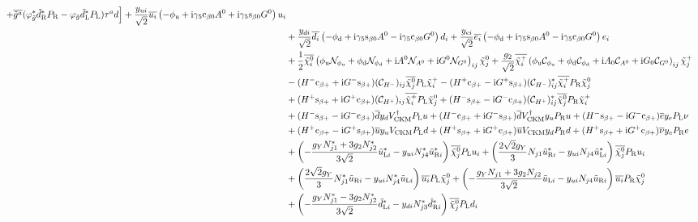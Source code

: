 \documentclass[CheatSheet]{subfiles}
\begin{document}
\begin{equation}
\begin{split}
 + \overline{\tig^a}(\varphi^*_{\tilde g} \tdR^{*}\PR -\varphi_{\tilde g}\tdL^{*}\PL) \tau^{a}d
\Bigr]
+\frac{\yu[i]}{\sqrt2}\overline{u_i}\left(- {\phi\w u}+\ii\gamma_5\co{\beta0}A^0 + \ii\gamma_5\si{\beta0}G^0\right) u_i
\\&
+\frac{\yd[i]}{\sqrt2}\overline{d_i}\left(- {\phi\w d}+\ii\gamma_5\si{\beta0}A^0 - \ii\gamma_5\co{\beta0}G^0\right) d_i
+\frac{\ye[i]}{\sqrt2}\overline{e_i}\left(- {\phi\w d}+\ii\gamma_5\si{\beta0}A^0 - \ii\gamma_5\co{\beta0}G^0\right) e_i
\\&
+ \frac12\overline{\neut[i]}\left(
    \phi\w u \mathcal N_{\phi\w u}  + \phi\w d \mathcal N_{\phi\w d}  + \ii A^0 \mathcal N_{A^0}  + \ii G^0\mathcal N_{G^0}
  \right)_{ij}\neut[j]
+\frac{g_2}{\sqrt2}\overline{\charP[i]}\left(
      \phi\w u \mathcal C_{\phi\w u}  + \phi\w d \mathcal C_{\phi\w d}
    + \ii A_0 \mathcal C_{A^0}  + \ii G_0\mathcal C_{G^0}
\right)_{ij}\charP[j]
\\&
  - (H^-\co{\beta+}+\ii G^-\si{\beta+}) (\mathcal C_{H^-})_{ij} \overline{\neut[j]}\PL \charP[i]
  - (H^+\co{\beta+}-\ii G^+\si{\beta+}) (\mathcal C_{H^-})_{ij}^*  \overline{\charP[i]}\PR\neut[j]
\\&
  + (H^+\si{\beta+}+\ii G^+\co{\beta+}) (\mathcal C_{H^+})_{ij} \overline{\charP[i]}\PL\neut[j]
  + (H^-\si{\beta+}-\ii G^-\co{\beta+}) (\mathcal C_{H^+})_{ij}^* \overline{\neut[j]}\PR \charP[i]
\\&
  + (H^-\si{\beta+}-\ii G^-\co{\beta+}) \overline{d}\yd V\w{CKM}^\dagger\PL u
  + (H^-\co{\beta+}+\ii G^-\si{\beta+}) \overline{d}V\w{CKM}^\dagger\yu \PR u
  + (H^-\si{\beta+}-\ii G^-\co{\beta+}) \overline{e}\ye\PL\nu
\\&
  + (H^+\co{\beta+}-\ii G^+\si{\beta+}) \overline{u}\yu V\w{CKM} \PL d
  + (H^+\si{\beta+}+\ii G^+\co{\beta+}) \overline{u}V\w{CKM}\yd \PR d
  + (H^+\si{\beta+}+\ii G^+\co{\beta+}) \overline{\nu}\ye\PR e
\\&+ \left(-\frac{g_Y N_{j1}^*+3g_2 N_{j2}^*}{3\sqrt{2}}\tuL[i]^{*}-\yu[i]N_{j4}^*\tuR[i]^{*}\right){\overline{\neut[j]}\PL u_i}
   + \left(\frac{2\sqrt2g_Y}{3} N_{j1} \tuR[i]^*-\yu[i]N_{j4}\tuL[i]^* \right){\overline{\neut[j]}\PR u_i}
\\&+ \left(\frac{2\sqrt2g_Y}{3} N_{j1}^* \tuR[i]-\yu[i]N_{j4}^*\tuL[i] \right){\overline{u_i}\PL \neut[j]}
   +  \left(-\frac{g_Y N_{j1}+3g_2 N_{j2}}{3\sqrt{2}}\tuL[i]-\yu[i]N_{j4}\tuR[i]\right){\overline{u_i}\PR \neut[j]}
\\&+ \left(-\frac{g_Y N_{j1}^*-3g_2 N_{j2}^*}{3\sqrt{2}}\tdL[i]^{*}-\yd[i]N_{j3}^*\tdR[i]^{*}\right){\overline{\neut[j]}\PL d_i}

\end{split}
\end{equation}
\end{document}
